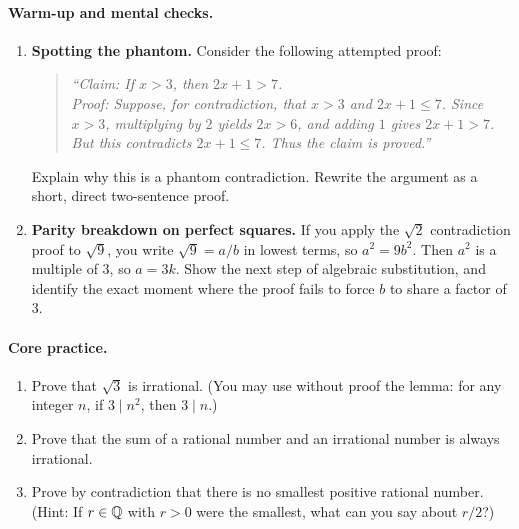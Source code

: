 \paragraph{Warm-up and mental checks.}
\begin{enumerate}
\item \textbf{Spotting the phantom.} Consider the following attempted proof:
\begin{quote}
\itshape ``Claim: If $x > 3$, then $2x + 1 > 7$.\\
Proof: Suppose, for contradiction, that $x > 3$ and $2x + 1 \le 7$. Since $x > 3$, multiplying by $2$ yields $2x > 6$, and adding $1$ gives $2x + 1 > 7$. But this contradicts $2x + 1 \le 7$. Thus the claim is proved.''
\end{quote}
Explain why this is a phantom contradiction. Rewrite the argument as a short, direct two-sentence proof.

\item \textbf{Parity breakdown on perfect squares.} If you apply the $\sqrt{2}$ contradiction proof to $\sqrt{9}$, you write $\sqrt{9} = a/b$ in lowest terms, so $a^2 = 9b^2$. Then $a^2$ is a multiple of $3$, so $a = 3k$. Show the next step of algebraic substitution, and identify the exact moment where the proof fails to force $b$ to share a factor of $3$.
\end{enumerate}

\paragraph{Core practice.}
\begin{enumerate}[resume]
\item Prove that $\sqrt{3}$ is irrational. (You may use without proof the lemma: for any integer $n$, if $3 \mid n^2$, then $3 \mid n$.)
\item Prove that the sum of a rational number and an irrational number is always irrational.
\item Prove by contradiction that there is no smallest positive rational number. (Hint: If $r \in \mathbb{Q}$ with $r > 0$ were the smallest, what can you say about $r/2$?)
\end{enumerate}

